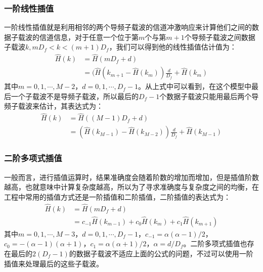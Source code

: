 \subsubsection{一阶线性插值}
一阶线性插值就是利用相邻的两个导频子载波的信道冲激响应来计算他们之间的数据子载波的信道信息，对于任意一个位于第$m$个与第$m+1$个导频子载波之间数据子载波$k, mD_f<k<(m+1)D_f$，我们可以得到他的线性插值估计值为\cite{sandell1996comparative}：
\begin{equation}
\begin{aligned}
\hat{H}(k)&=\hat{H}(mD_f+d) \\
&=(\hat{H}(k_{m+1}-\hat{H}(k_m))\frac{d}{D_f}+\hat{H}(k_m)
\end{aligned}
\end{equation}
其中$m=0,1,\cdots,M-2$，$d=0,1,\cdots,D_f-1$。从上式中可以看到，在这个模型中最后一个子载波不是导频子载波，所以最后的$D_f-1$个数据子载波只能用最后两个导频子载波来估计，其表达式为：
\begin{equation}
\begin{aligned}
\hat{H}(k) &= \hat{H}((M-1)D_f+d) \\
&= (\hat{H}(k_{M-1})-\hat{H}(k_{M-2}))\frac{d}{D_f}+\hat{H}(k_{M-1})
\end{aligned}
\end{equation}
\subsubsection{二阶多项式插值}
一般而言，进行插值运算时，结果准确度会随着阶数的增加而增加\cite{garcia2000pilot}，但是插值阶数越高，也就意味中计算复杂度越高，所以为了寻求准确度与复杂度之间的均衡，在工程中常用的插值方式还是一阶插值和二阶插值，二阶插值的表达式为：
\begin{equation}
\begin{aligned}
\hat{H}(k) &= \hat{H}(mD_f+d) \\
&=c_{-1}\hat{H}(k_{m-1})+c_0\hat{H}(k_m)+c_1\hat{H}(k_{m+1})
\end{aligned}
\end{equation}
其中$m=0,1,\cdots,M-3$，$d=0,1,\cdots,D_f-1$，$c_{-1}=\alpha(\alpha-1)/2$，
$c_0=-(\alpha-1)(\alpha+1)$，$c_1=\alpha(\alpha+1)/2$，$\alpha=d/D_f$。二阶多项式插值也存在最后的$2(D_f-1)$的数据子载波不适应上面的公式的问题，不过可以使用一阶插值来处理最后的这些子载波。
